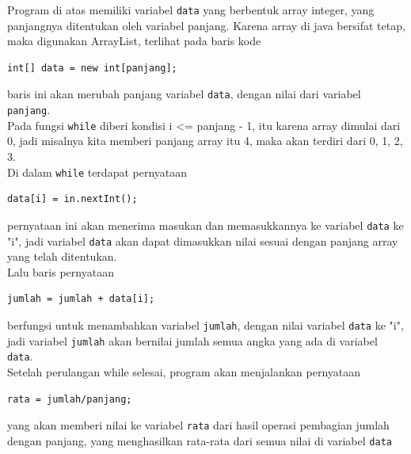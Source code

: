 \documentclass[a4paper,12pt]{article}
\begin{document}
Program di atas memiliki variabel \texttt{data} yang berbentuk array integer, yang panjangnya ditentukan oleh variabel panjang. Karena array di java bersifat tetap, maka digunakan ArrayList, terlihat pada baris kode
\begin{lstlisting}
int[] data = new int[panjang];
\end{lstlisting}   
baris ini akan merubah panjang variabel \texttt{data}, dengan nilai dari variabel \texttt{panjang}.\\
Pada fungsi \texttt{while} diberi kondisi i <= panjang - 1, itu karena array dimulai dari 0, jadi misalnya kita memberi panjang array itu 4, maka akan terdiri dari 0, 1, 2, 3.\\
Di dalam \texttt{while} terdapat pernyataan
\begin{lstlisting}
data[i] = in.nextInt();
\end{lstlisting}
pernyataan ini akan menerima masukan dan memasukkannya ke variabel \texttt{data} ke "i", jadi variabel \texttt{data} akan dapat dimasukkan nilai sesuai dengan panjang array yang telah ditentukan.\\
Lalu baris pernyataan
\begin{lstlisting}
jumlah = jumlah + data[i];
\end{lstlisting}
berfungsi untuk menambahkan variabel \texttt{jumlah}, dengan nilai variabel \texttt{data} ke "i", jadi variabel \texttt{jumlah} akan bernilai jumlah semua angka yang ada di variabel \texttt{data}.\\
Setelah perulangan while selesai, program akan menjalankan pernyataan
\begin{lstlisting}
rata = jumlah/panjang;
\end{lstlisting}
yang akan memberi nilai ke variabel \texttt{rata} dari hasil operasi pembagian jumlah dengan panjang, yang menghasilkan rata-rata dari semua nilai di variabel \texttt{data}
\end{document}
